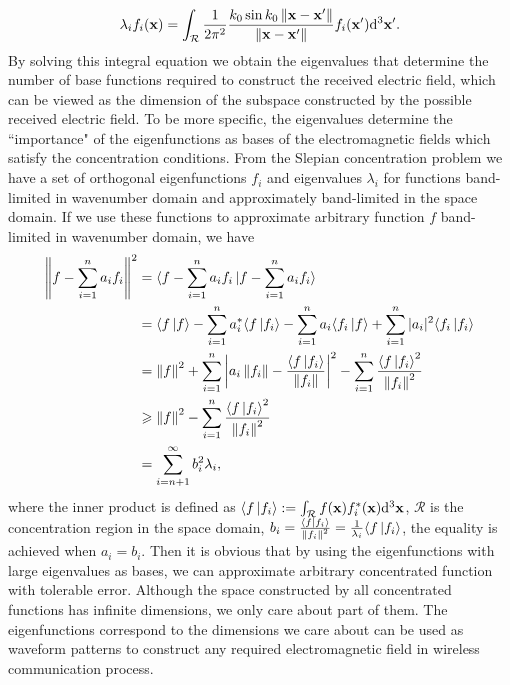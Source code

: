 \documentclass[12pt,draftclsnofoot,journal,onecolumn]{IEEEtran}
\begin{document}
    	\begin{equation}
    	\lambda_i f_i({\bf x}) = \int_{\mathcal{R}} \frac{1}{2\pi^2} \frac{k_0\sin k_0 \left\| {\bf x}-{\bf x}' \right\|}{\left\|  {\bf x}-{\bf x}' \right\|}f_i({\bf x}'){\rm d}^3{\bf x}'.
    	\label{equ_sphere_surface}
    \end{equation}
    By solving this integral equation we obtain the eigenvalues that determine the number of base functions required to construct the received electric field, which can be viewed as the dimension of the subspace constructed by the possible received electric field. To be more specific, the eigenvalues determine the {\color{red}``importance"} of the eigenfunctions as bases of the electromagnetic fields which satisfy the concentration conditions. From the Slepian concentration problem we have a set of orthogonal eigenfunctions $f_i$ and eigenvalues $\lambda_i$ for functions band-limited in wavenumber domain and approximately band-limited in the space domain. If we use these functions to approximate arbitrary function $f$ band-limited in wavenumber domain, we have 
		\begin{equation}
	\begin{aligned}
		\left\| f-\sum_{i=1}^n a_i f_i  \right\|^2 &= 
		\langle f-\sum_{i=1}^n a_i f_i \ket{f-\sum_{i=1}^n a_i f_i}
		\\& = \langle f \ket{f} - \sum_{i=1}^n a_i^* \langle f \ket{f_i} -\sum_{i=1}^n a_i \langle f_i \ket{f} + \sum_{i=1}^n |a_i|^2 \langle f_i \ket{f_i}
		\\& = \left\| f \right\|^2 + \sum_{i=1}^n \left| a_i \left\| f_i \right\| - \frac{ \langle f \ket{f_i}}{\left\| f_i \right\|} \right|^2 - \sum_{i=1}^n \frac{ \langle f \ket{f_i}^2}{\left\| f_i \right\|^2}
		\\&\geqslant  \left\| f \right\|^2 - \sum_{i=1}^n \frac{ \langle f \ket{f_i}^2}{\left\| f_i \right\|^2}
		\\&=\sum_{i=n+1}^{\infty} b_i^2 \lambda_i ,
	\end{aligned}
	\label{eqn_min_f_approx}
	\end{equation}
	where the inner product is defined as $\langle f \ket{f_i}:= \int_{\mathcal{R}} f({\bf x}) f_i^*({\bf x}) {\rm d}^3{\bf x}$, $\mathcal{R}$ is the concentration region in the space domain, $b_i = \frac{ \langle f \ket{f_i}}{\left\| f_i \right\|^2}= \frac{1}{\lambda_i} \langle f \ket{f_i}$, the equality is achieved when $a_i=b_i$. Then it is obvious that by using the eigenfunctions with large eigenvalues as bases, we can approximate arbitrary concentrated function with tolerable error. Although the space constructed by all concentrated functions has infinite dimensions, we only care about part of them. The eigenfunctions correspond to the dimensions we care about can be used as waveform patterns to construct any required electromagnetic field in wireless communication process.     
	
\end{document}
